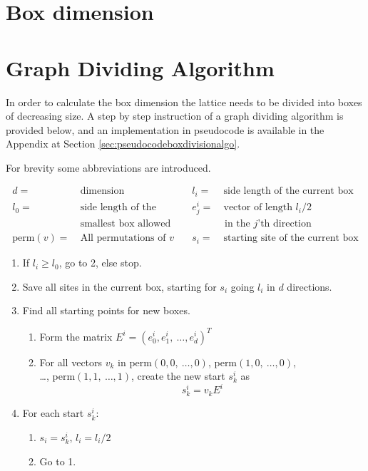 \section{Box dimension}
\label{sec:boxdimension}

\section{Graph Dividing Algorithm}
\label{sec:GraphDivisonAlgorithm}


In order to calculate the box dimension the lattice needs to be divided into boxes of decreasing size. A step by step instruction of a graph dividing algorithm is provided below, and an implementation in pseudocode is available in the Appendix at Section \ref{sec:pseudocodeboxdivisionalgo}.

For brevity some abbreviations are introduced.

\begin{equation*}
    \begin{aligned}
        d =& \ \text{dimension} &\quad l_i =& \ \text{side length of the current box}\\
%
        l_0 =& \ \text{side length of the} &\quad e_j^i =& \ \text{vector of length } l_i / 2 \\
%
             & \ \text{smallest box allowed} & & \text{ in the }j\text{'th direction} \\
%
        \text{perm}(v) =& \ \text{All permutations of } v &\quad s_i =& \ \text{starting site of the current box}
    \end{aligned}
\end{equation*}

\begin{enumerate}
    \item If $l_i \geq l_0$, go to 2, else stop.
%
    \item Save all sites in the current box, starting for $s_i$ going $l_i$ in $d$ directions.
%
    \item Find all starting points for new boxes.
%
    \begin{enumerate}[label=(\roman*)]
%
        \item Form the matrix $E^i = (e_0^i, e_1^i, \  \ldots, e_d^i)^T$
%
        \item For all vectors $v_k$ in perm$(0, 0, \ \ldots , 0)$, perm$(1, 0, \ \ldots , 0)$, \\ \ldots, perm$(1, 1, \ \ldots , 1)$, create the new start $s^i_k$ as $$s^i_k = v_k E^i$$
%
    \end{enumerate}
%
    \item For each start $s_k^i$:
    \begin{enumerate}[label=(\roman*)]
        \item $s_i = s^i_k$, $l_i = l_i / 2$
        \item Go to 1.
    \end{enumerate}
%
\end{enumerate}
